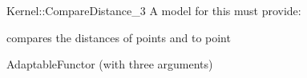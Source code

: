 \begin{ccRefFunctionObjectConcept}{Kernel::CompareDistance_3}
A model for this must provide:


      {compares the distances of points  and  to point }

\ccRefines
AdaptableFunctor (with three arguments)

\ccSeeAlso
{} \\

\end{ccRefFunctionObjectConcept}

